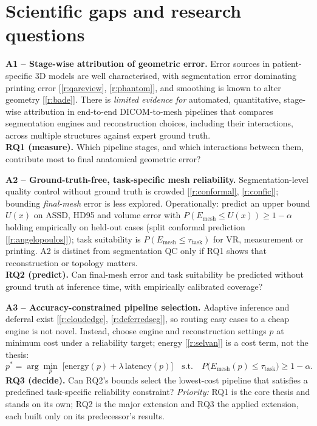 \documentclass[10pt,a4paper]{article}
\newcommand{\rf}[1]{\ref{#1}}
\begin{document}
\section{Scientific gaps and research questions}
\textbf{A1 -- Stage-wise attribution of geometric error.} Error sources in patient-specific 3D models are well characterised, with segmentation error dominating printing error [\rf{r:qareview}, \rf{r:phantom}], and smoothing is known to alter geometry [\rf{r:bade}]. There is \emph{limited evidence for} automated, quantitative, stage-wise attribution in end-to-end DICOM-to-mesh pipelines that compares segmentation engines and reconstruction choices, including their interactions, across multiple structures against expert ground truth.\\
\textbf{RQ1 (measure).} Which pipeline stages, and which interactions between them, contribute most to final anatomical geometric error?

\textbf{A2 -- Ground-truth-free, task-specific mesh reliability.} Segmentation-level quality control without ground truth is crowded [\rf{r:conformal}, \rf{r:confic}]; bounding \emph{final-mesh} error is less explored. Operationally: predict an upper bound $U(x)$ on ASSD, HD95 and volume error with $P(E_{\text{mesh}}\le U(x))\ge 1-\alpha$ holding empirically on held-out cases (split conformal prediction [\rf{r:angelopoulos}]); task suitability is $P(E_{\text{mesh}}\le\tau_{\text{task}})$ for VR, measurement or printing. A2 is distinct from segmentation QC only if RQ1 shows that reconstruction or topology matters.\\
\textbf{RQ2 (predict).} Can final-mesh error and task suitability be predicted without ground truth at inference time, with empirically calibrated coverage?

\textbf{A3 -- Accuracy-constrained pipeline selection.} Adaptive inference and deferral exist [\rf{r:cloudedge}, \rf{r:deferredseg}], so routing easy cases to a cheap engine is not novel. Instead, choose engine and reconstruction settings $p$ at minimum cost under a reliability target; energy [\rf{r:selvan}] is a cost term, not the thesis:
\[
p^{*}=\arg\min_{p}\;\bigl[\text{energy}(p)+\lambda\,\text{latency}(p)\bigr]\quad\text{s.t.}\quad P\bigl(E_{\text{mesh}}(p)\le\tau_{\text{task}}\bigr)\ge 1-\alpha .
\]
\textbf{RQ3 (decide).} Can RQ2's bounds select the lowest-cost pipeline that satisfies a predefined task-specific reliability constraint? \emph{Priority:} RQ1 is the core thesis and stands on its own; RQ2 is the major extension and RQ3 the applied extension, each built only on its predecessor's results.
\end{document}
